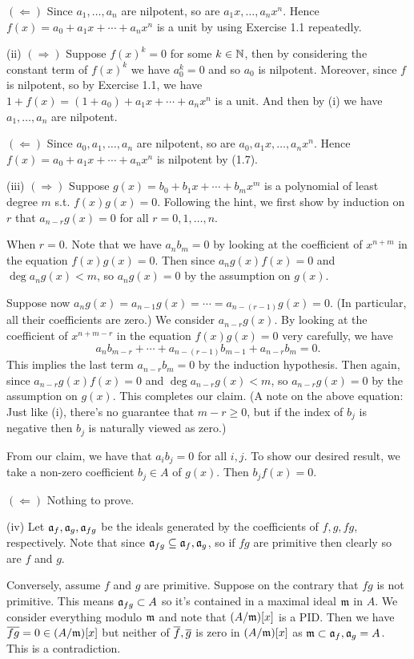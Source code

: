 \documentclass[../A&M.tex]{subfiles}
\begin{document}
$(\Leftarrow)$ Since $a_1,\ldots,a_n$ are nilpotent, so are $a_1x,\ldots,a_nx^n$. Hence $f(x)=a_0+a_1x+\cdots+a_nx^n$ is a unit by using Exercise 1.1 repeatedly.

(ii) $(\Rightarrow)$ Suppose $f(x)^k=0$ for some $k\in\mathbb{N}$, then by considering the constant term of $f(x)^k$ we have $a_0^k=0$ and so $a_0$ is nilpotent. Moreover, since $f$ is nilpotent, so by Exercise 1.1, we have $1+f(x) = (1+a_0)+a_1x+\cdots+a_nx^n$ is a unit. And then by (i) we have $a_1,\ldots,a_n$ are nilpotent.

$(\Leftarrow)$ Since $a_0,a_1,\ldots,a_n$ are nilpotent, so are $a_0,a_1x,\ldots,a_nx^n$. Hence $f(x)=a_0+a_1x+\cdots+a_nx^n$ is nilpotent by (1.7).

(iii) $(\Rightarrow)$ Suppose $g(x)=b_0+b_1x+\cdots+b_mx^m$ is a polynomial of least degree $m$ s.t. $f(x)g(x)=0$. Following the hint, we first show by induction on $r$ that $a_{n-r}g(x)=0$ for all $r=0,1,\ldots,n$.

When $r=0$. Note that we have $a_n b_m=0$ by looking at the coefficient of $x^{n+m}$ in the equation $f(x)g(x)=0$. Then since $a_ng(x)f(x)=0$ and $\deg a_ng(x)<m$, so $a_ng(x)=0$ by the assumption on $g(x)$.

Suppose now $a_ng(x) = a_{n-1}g(x) = \cdots = a_{n-(r-1)}g(x) = 0$. (In particular, all their coefficients are zero.) We consider $a_{n-r}g(x)$. By looking at the coefficient of $x^{n+m-r}$ in the equation $f(x)g(x) = 0$ very carefully, we have
$$
a_n b_{m-r} + \cdots + a_{n-(r-1)} b_{m-1} + a_{n-r} b_m = 0.
$$
This implies the last term $a_{n-r} b_m=0$ by the induction hypothesis. Then again, since $a_{n-r}g(x)f(x)=0$ and $\deg a_{n-r}g(x)<m$, so $a_{n-r}g(x)=0$ by the assumption on $g(x)$. This completes our claim. (A note on the above equation: Just like (i), there's no guarantee that $m-r\geq0$, but if the index of $b_j$ is negative then $b_j$ is naturally viewed as zero.)

From our claim, we have that $a_ib_j=0$ for all $i,j$. To show our desired result, we take a non-zero coefficient $b_j\in A$ of $g(x)$. Then $b_jf(x)=0$.

$(\Leftarrow)$ Nothing to prove.

(iv) Let $\mathfrak{a}_f,\mathfrak{a}_g,\mathfrak{a}_{fg}$ be the ideals generated by the coefficients of $f,g,fg$, respectively. Note that since $\mathfrak{a}_{fg}\subseteq \mathfrak{a}_f,\mathfrak{a}_g$, so if $fg$ are primitive then clearly so are $f$ and $g$.

Conversely, assume $f$ and $g$ are primitive. Suppose on the contrary that $fg$ is not primitive. This means $\mathfrak{a}_{fg}\subset A$ so it's contained in a maximal ideal $\mathfrak{m}$ in $A$. We consider everything modulo $\mathfrak{m}$ and note that $(A/\mathfrak{m})[x]$ is a PID. Then we have $\overline{fg} = 0 \in (A/\mathfrak{m})[x]$ but neither of $\overline{f},\overline{g}$ is zero in $(A/\mathfrak{m})[x]$ as $\mathfrak{m} \subset \mathfrak{a}_f,\mathfrak{a}_g = A$. This is a contradiction.
\end{document}
